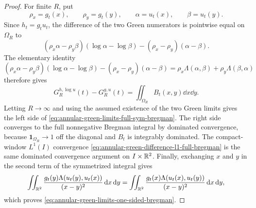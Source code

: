 \begin{proof}
For finite \(R\), put
\[
\rho_x=g_t(x),\qquad \rho_y=g_t(y),\qquad
\alpha=u_t(x),\qquad \beta=u_t(y).
\]
Since \(h_t=g_tu_t\), the difference of the two Green numerators is
pointwise equal on \(\Omega_R\) to
\[
(\rho_x\alpha-\rho_y\beta)(\log\alpha-\log\beta)
-(\rho_x-\rho_y)(\alpha-\beta).
\]
The elementary identity
\[
(\rho_x\alpha-\rho_y\beta)(\log\alpha-\log\beta)
-(\rho_x-\rho_y)(\alpha-\beta)
=\rho_x\Lambda(\alpha,\beta)+\rho_y\Lambda(\beta,\alpha)
\]
therefore gives
\[
G_R^{h,\log u}(t)-G_R^{g,u}(t)
=\iint_{\Omega_R}B_t(x,y)\dd x\dd y .
\]
Letting \(R\to\infty\) and using the assumed existence of the two Green
limits gives the left side of
\eqref{eq:annular-green-limits-full-sym-bregman}.  The right side converges
to the full nonnegative Bregman integral by dominated convergence, because
\(\mathbf1_{\Omega_R}\to1\) off the diagonal and \(B_t\) is integrably
dominated.  The compact-window \(L^1(I)\) convergence
\eqref{eq:annular-green-difference-l1-full-bregman} is the same dominated
convergence argument on \(I\times\mathbb{R}^2\).  Finally, exchanging \(x\) and
\(y\) in the second term of the symmetrized integral gives
\[
\iint_{\mathbb{R}^2}
\frac{g_t(y)\Lambda(u_t(y),u_t(x))}{(x-y)^2}\,\mathrm{d} x\,\mathrm{d} y
=\iint_{\mathbb{R}^2}
\frac{g_t(x)\Lambda(u_t(x),u_t(y))}{(x-y)^2}\,\mathrm{d} x\,\mathrm{d} y,
\]
which proves \eqref{eq:annular-green-limits-one-sided-bregman}.
\end{proof}

